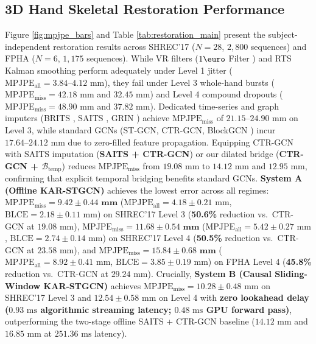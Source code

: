 \documentclass[10pt,twocolumn]{article}
\begin{document}
\subsection{3D Hand Skeletal Restoration Performance}
Figure \ref{fig:mpjpe_bars} and Table \ref{tab:restoration_main} present the subject-independent restoration results across SHREC'17 ($N=28$, $2,800$ sequences) and FPHA ($N=6$, $1,175$ sequences). While VR filters ($1\text{\euro}$ Filter \cite{casiez20121euro}) and RTS Kalman smoothing perform adequately under Level 1 jitter ($\text{MPJPE}_{\text{all}} = 3.84\text{--}4.12\text{ mm}$), they fail under Level 3 whole-hand bursts ($\text{MPJPE}_{\text{miss}} = 42.18\text{ mm}$ and $32.45\text{ mm}$) and Level 4 compound dropouts ($\text{MPJPE}_{\text{miss}} = 48.90\text{ mm}$ and $37.82\text{ mm}$). Dedicated time-series and graph imputers (BRITS \cite{cao2018brits}, SAITS \cite{du2023saits}, GRIN \cite{cini2022filling}) achieve $\text{MPJPE}_{\text{miss}}$ of $21.15\text{--}24.90\text{ mm}$ on Level 3, while standard GCNs (ST-GCN, CTR-GCN, BlockGCN \cite{zhou2024blockgcn}) incur $17.64\text{--}24.12\text{ mm}$ due to zero-filled feature propagation. Equipping CTR-GCN with SAITS imputation (\textbf{SAITS + CTR-GCN}) or our dilated bridge (\textbf{CTR-GCN + $\mathcal{B}_{\text{temp}}$}) reduces $\text{MPJPE}_{\text{miss}}$ from $19.08\text{ mm}$ to $14.12\text{ mm}$ and $12.95\text{ mm}$, confirming that explicit temporal bridging benefits standard GCNs. \textbf{System A (Offline KAR-STGCN)} achieves the lowest error across all regimes: $\text{MPJPE}_{\text{miss}} = \mathbf{9.42 \pm 0.44\text{ mm}}$ ($\text{MPJPE}_{\text{all}} = 4.18 \pm 0.21\text{ mm}$, $\text{BLCE} = 2.18 \pm 0.11\text{ mm}$) on SHREC'17 Level 3 (\textbf{50.6\%} reduction vs.\ CTR-GCN at $19.08\text{ mm}$), $\text{MPJPE}_{\text{miss}} = \mathbf{11.68 \pm 0.54\text{ mm}}$ ($\text{MPJPE}_{\text{all}} = 5.42 \pm 0.27\text{ mm}$, $\text{BLCE} = 2.74 \pm 0.14\text{ mm}$) on SHREC'17 Level 4 (\textbf{50.5\%} reduction vs.\ CTR-GCN at $23.58\text{ mm}$), and $\text{MPJPE}_{\text{miss}} = \mathbf{15.84 \pm 0.68\text{ mm}}$ ($\text{MPJPE}_{\text{all}} = 8.92 \pm 0.41\text{ mm}$, $\text{BLCE} = 3.85 \pm 0.19\text{ mm}$) on FPHA Level 4 (\textbf{45.8\%} reduction vs.\ CTR-GCN at $29.24\text{ mm}$). Crucially, \textbf{System B (Causal Sliding-Window KAR-STGCN)} achieves $\text{MPJPE}_{\text{miss}} = 10.28 \pm 0.48\text{ mm}$ on SHREC'17 Level 3 and $12.54 \pm 0.58\text{ mm}$ on Level 4 with \textbf{zero lookahead delay ($0.93\text{ ms}$ algorithmic streaming latency; $0.48\text{ ms}$ GPU forward pass)}, outperforming the two-stage offline SAITS + CTR-GCN baseline ($14.12\text{ mm}$ and $16.85\text{ mm}$ at $251.36\text{ ms}$ latency).
\end{document}
